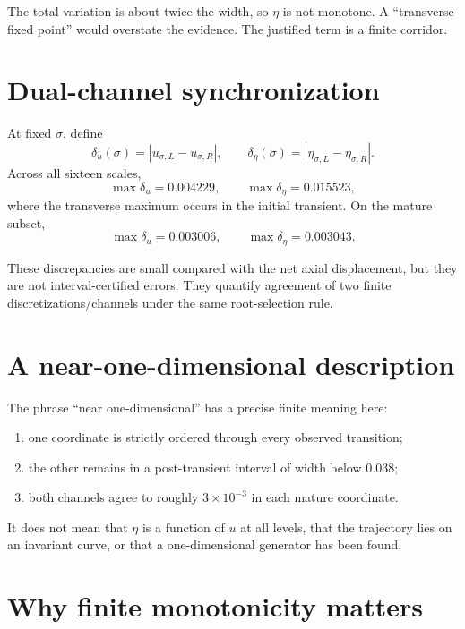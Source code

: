 \documentclass[12pt]{article}
\theoremstyle{remark}\newtheorem{remark}[theorem]{Remark}
\begin{document}
The total variation is about twice the width, so $\eta$ is not monotone.  A
``transverse fixed point'' would overstate the evidence.  The justified term
is a finite corridor.

\section{Dual-channel synchronization}

At fixed $\sigma$, define
\begin{equation}
 \delta_u(\sigma)=|u_{\sigma,L}-u_{\sigma,R}|,
 \qquad
 \delta_\eta(\sigma)=|\eta_{\sigma,L}-\eta_{\sigma,R}|.
\end{equation}
Across all sixteen scales,
\begin{equation}
 \max\delta_u=0.004229,
 \qquad \max\delta_\eta=0.015523,
\end{equation}
where the transverse maximum occurs in the initial transient.  On the mature
subset,
\begin{equation}\label{eq:maturesync}
 \max\delta_u=0.003006,
 \qquad \max\delta_\eta=0.003043.
\end{equation}

These discrepancies are small compared with the net axial displacement, but
they are not interval-certified errors.  They quantify agreement of two
finite discretizations/channels under the same root-selection rule.

\section{A near-one-dimensional description}

The phrase ``near one-dimensional'' has a precise finite meaning here:
\begin{enumerate}[leftmargin=2em]
\item one coordinate is strictly ordered through every observed transition;
\item the other remains in a post-transient interval of width below $0.038$;
\item both channels agree to roughly $3\times10^{-3}$ in each mature
coordinate.
\end{enumerate}
It does not mean that $\eta$ is a function of $u$ at all levels, that the
trajectory lies on an invariant curve, or that a one-dimensional generator
has been found.

\section{Why finite monotonicity matters}
\end{document}
